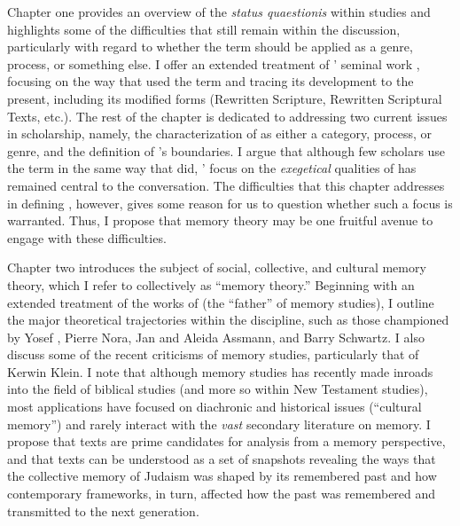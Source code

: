 Chapter one provides an overview of the \emph{status quaestionis} within \rwb studies and highlights some of the difficulties that still remain within the discussion, particularly with regard to whether the term should be applied as a genre, process, or something else. I offer an extended treatment of \vermes' seminal work , focusing on the way that \vermes used the term and tracing its development to the present, including its modified forms (Rewritten Scripture, Rewritten Scriptural Texts, etc.). The rest of the chapter is dedicated to addressing two current issues in \rwb scholarship, namely, the characterization of \rwb as either a category, process, or genre, and the definition of \rwb's boundaries. I argue that although few scholars use the term \rwb in the same way that \vermes did, \vermes' focus on the \emph{exegetical} qualities of \rwb has remained central to the conversation. The difficulties that this chapter addresses in defining \rwb, however, gives some reason for us to question whether such a focus is warranted. Thus, I propose that memory theory may be one fruitful avenue to engage with these difficulties.

Chapter two introduces the subject of social, collective, and cultural memory theory, which I refer to collectively as ``memory theory.'' Beginning with an extended treatment of the works of \Halbwachs (the ``father'' of memory studies), I outline the major theoretical trajectories within the discipline, such as those championed by Yosef \yerushalmi, Pierre Nora, Jan and Aleida Assmann, and Barry Schwartz. I also discuss some of the recent criticisms of memory studies, particularly that of Kerwin Klein. I note that although memory studies has recently made inroads into the field of biblical studies (and more so within New Testament studies), most applications have focused on diachronic and historical issues (``cultural memory'') and rarely interact with the \emph{vast} secondary literature on memory. I propose that \rwb texts are prime candidates for analysis from a memory perspective, and that \rwb texts can be understood as a set of snapshots revealing the ways that the collective memory of \secondtemple Judaism was shaped by its remembered past and how contemporary frameworks, in turn, affected how the past was remembered and transmitted to the next generation.

